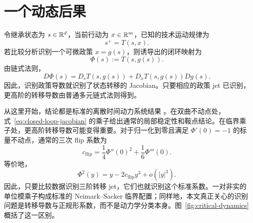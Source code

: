 \section{一个动态后果}
\label{sec:dynamics}

令继承状态为 $s\in\mathbb R^d$，当前行动为 $x\in\mathbb R^m$，已知的技术运动规律为
\[
s^+=T(s,x).
\]
若比较分析识别一个可微政策 $x=g(s)$，则诱导出的闭环映射为
\begin{equation}
\Phi(s):=T(s,g(s)).
\label{eq:closed-loop-map}
\end{equation}
由链式法则，
\begin{equation}
\boxed{
D\Phi(s)=D_sT(s,g(s))+D_xT(s,g(s))Dg(s).}
\label{eq:closed-loop-jacobian}
\end{equation}
因此，识别政策导数就识别了状态转移的 Jacobian。只要相应的政策 jet 已识别，更高阶的转移导数由普通多元链式法则得到。

从这里开始，结论都是标准的离散时间动力系统结果 \citep{elaydi2005,kuznetsov2004}。在双曲不动点处，式~\eqref{eq:closed-loop-jacobian} 的乘子给出通常的局部稳定性和鞍点结论。在临界乘子处，更高阶转移导数可能变得重要。对于归一化到零且满足 $\Phi'(0)=-1$ 的标量不动点，通常的三次 flip 系数为
\begin{equation}
\boxed{
c_{\mathrm{flip}}
=
\frac14\Phi''(0)^2+\frac16\Phi'''(0).}
\label{eq:flip-coefficient}
\end{equation}
等价地，
\[
\Phi^2(y)=y-2c_{\mathrm{flip}}y^3+o(|y|^3).
\]
因此，只要比较数据识别三阶转移 jet，它们也就识别这个标准系数。一对非实的单位模乘子构成标准的 Neimark--Sacker 临界配置；同样地，本文真正关心的识别问题是转移导数与正规形系数，而不是动力学分类本身。图~\ref{fig:critical-dynamics} 概括了这一区别。

